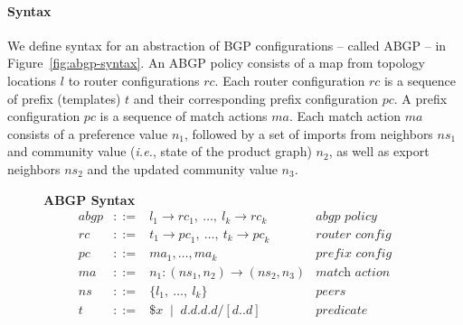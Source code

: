 \documentclass[twocolumn, openany]{sig-alternate-10pt}
\newcommand{\IE}{\emph{i.e.}}
\newcommand{\para}[1]{\paragraph*{\textbf{#1}}}
\newcommand{\BNFALT}{\;\;|\;\;}
\newcommand{\hdr}[2]{\flushleft \chdr{\hspace{5mm}#1}{#2}}
\newcommand{\chdr}[2]{\textbf{#1} {#2} \\ \centering}%
\begin{document}
\para{Syntax}

We define syntax for an abstraction of BGP configurations -- called ABGP -- in Figure~\ref{fig:abgp-syntax}. An ABGP policy consists of a map from topology locations $l$ to router configurations $rc$. Each router configuration $rc$ is a sequence of prefix (templates) $t$ and their corresponding prefix configuration $pc$. A prefix configuration $pc$ is a sequence of match actions $ma$. Each match action $ma$ consists of a preference value $n_1$, followed by a set of imports from neighbors $ns_1$ and community value (\IE, state of the product graph) $n_2$, as well as export neighbors $ns_2$ and the updated community value $n_3$.

\newcommand{\Con}{\text{con}}

\vspace{2em}
\begin{figure}[h!]\small

  \hrulefill%
  \vspace{1em}

  \begin{minipage}[t]{.46\linewidth}
  \hdr{ABGP Syntax}{}
  \vspace*{-1\baselineskip}
  \[ \begin{array}{rclr}
     abgp &::=& l_1 \rightarrow {rc}_1, ~\dots,~ l_k \rightarrow {rc}_k & \textit{abgp policy} \\
     rc   &::=& t_1 \rightarrow {pc}_1, ~\dots,~ t_k \rightarrow {pc}_k & \textit{router config} \\
     pc   &::=& ma_1, \dots, ma_k & \textit{prefix config} \\
     ma   &::=& n_1 : ({ns}_1, n_2) \rightarrow ({ns}_2, n_3) & \textit{match action} \\
     ns   &::=& \{ l_1, ~\dots,~ l_k \} & \textit{peers} \\
     t    &::=& \$x \BNFALT d.d.d.d/[d..d] & \textit{predicate} \\
  \end{array} \]%


\end{minipage}
\end{figure}
\end{document}
